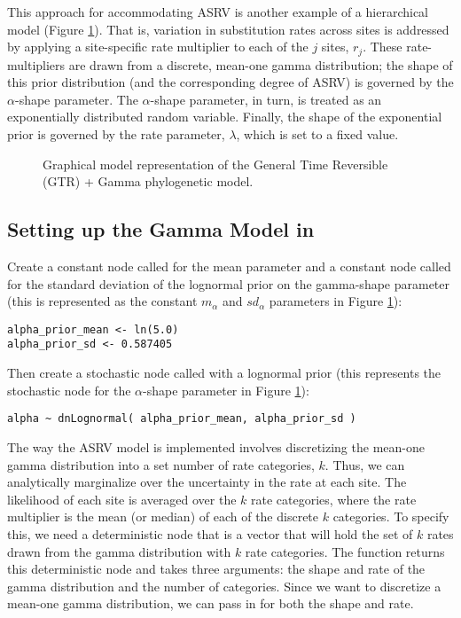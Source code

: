 This approach for accommodating ASRV is another example of a hierarchical model (Figure \ref{fig:gtrg}).
That is, variation in substitution rates across sites is addressed by applying a site-specific rate multiplier to each of the $j$ sites, $r_j$.
These rate-multipliers are drawn from a discrete, mean-one gamma distribution; the shape of this prior distribution (and the corresponding degree of ASRV) is governed by the $\alpha$-shape parameter.
The $\alpha$-shape parameter, in turn, is treated as an exponentially distributed random variable.
Finally, the shape of the exponential prior is governed by the rate parameter, $\lambda$, which is set to a fixed value.   

\begin{figure}[h!]
\centering
{}
\caption{\small Graphical model representation of the General Time Reversible (GTR) + Gamma phylogenetic model.}
\label{fig:gtrg}
\end{figure}

\subsection{Setting up the Gamma Model in \RevBayes}

Create a constant node called  for the mean parameter and a constant node called  for the standard deviation of the lognormal prior on the gamma-shape parameter (this is represented as the constant $m_\alpha$ and $sd_\alpha$ parameters in Figure \ref{fig:gtrg}):
{\tt\begin{snugshade*}
\begin{lstlisting}
alpha_prior_mean <- ln(5.0)
alpha_prior_sd <- 0.587405
\end{lstlisting}
\end{snugshade*}}

Then create a stochastic node called  with a lognormal prior (this represents the stochastic node for the $\alpha$-shape parameter in Figure \ref{fig:gtrg}):
{\tt\begin{snugshade*}
\begin{lstlisting}
alpha ~ dnLognormal( alpha_prior_mean, alpha_prior_sd )
\end{lstlisting}
\end{snugshade*}}

The way the ASRV model is implemented involves discretizing the mean-one gamma distribution into a set number of rate categories, $k$. 
Thus, we can analytically marginalize over the uncertainty in the rate at each site. 
The likelihood of each site is averaged over the $k$ rate categories, where the rate multiplier is the mean (or median) of each of the discrete $k$ categories. 
To specify this, we need a deterministic node that is a vector that will hold the set of $k$ rates drawn from the gamma distribution with $k$ rate categories. 
The  function returns this deterministic node and takes three arguments: the shape and rate of the gamma distribution and the number of categories. 
Since we want to discretize a mean-one gamma distribution, we can pass in  for both the shape and rate.


